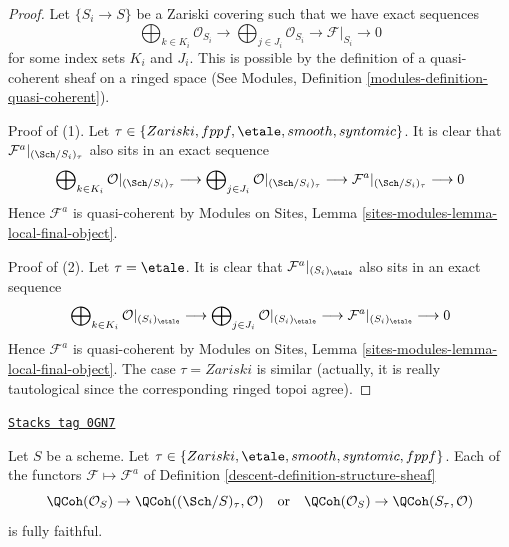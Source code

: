 \begin{proof}
Let $\{S_i \to S\}$ be a Zariski covering such that we have exact sequences
$$
\bigoplus\nolimits_{k \in K_i} \mathcal{O}_{S_i} \longrightarrow
\bigoplus\nolimits_{j \in J_i} \mathcal{O}_{S_i} \longrightarrow
\mathcal{F}|_{S_i} \longrightarrow 0
$$
for some index sets $K_i$ and $J_i$. This is possible by the definition
of a quasi-coherent sheaf on a ringed space
(See Modules, Definition \ref{modules-definition-quasi-coherent}).

\medskip\noindent
Proof of (1). Let $\tau \in \{Zariski, \linebreak[0] fppf, \linebreak[0]
\etale, \linebreak[0] smooth, \linebreak[0] syntomic\}$.
It is clear that $\mathcal{F}^a|_{(\Sch/S_i)_\tau}$ also
sits in an exact sequence
$$
\bigoplus\nolimits_{k \in K_i} \mathcal{O}|_{(\Sch/S_i)_\tau}
\longrightarrow
\bigoplus\nolimits_{j \in J_i} \mathcal{O}|_{(\Sch/S_i)_\tau}
\longrightarrow
\mathcal{F}^a|_{(\Sch/S_i)_\tau} \longrightarrow 0
$$
Hence $\mathcal{F}^a$ is quasi-coherent by Modules on Sites,
Lemma \ref{sites-modules-lemma-local-final-object}.

\medskip\noindent
Proof of (2). Let $\tau = \etale$.
It is clear that $\mathcal{F}^a|_{(S_i)_\etale}$ also sits
in an exact sequence
$$
\bigoplus\nolimits_{k \in K_i} \mathcal{O}|_{(S_i)_\etale}
\longrightarrow
\bigoplus\nolimits_{j \in J_i} \mathcal{O}|_{(S_i)_\etale}
\longrightarrow
\mathcal{F}^a|_{(S_i)_\etale} \longrightarrow 0
$$
Hence $\mathcal{F}^a$ is quasi-coherent by Modules on Sites,
Lemma \ref{sites-modules-lemma-local-final-object}.
The case $\tau = Zariski$ is similar (actually, it is really
tautological since the corresponding ringed topoi agree).
\end{proof}

\begin{lemma}
\label{descent-lemma-fully-faithful-associated}
\href{https://stacks.math.columbia.edu/tag/0GN7}{\texttt{Stacks tag 0GN7}}

Let $S$ be a scheme.
Let $\tau \in \{Zariski, \linebreak[0] \etale, \linebreak[0]
smooth, \linebreak[0] syntomic, \linebreak[0] fppf\}$.
Each of the functors $\mathcal{F} \mapsto \mathcal{F}^a$
of Definition \ref{descent-definition-structure-sheaf}
$$
\QCoh(\mathcal{O}_S) \to \QCoh((\Sch/S)_\tau, \mathcal{O})
\quad\text{or}\quad
\QCoh(\mathcal{O}_S) \to \QCoh(S_\tau, \mathcal{O})
$$
is fully faithful.
\end{lemma}

